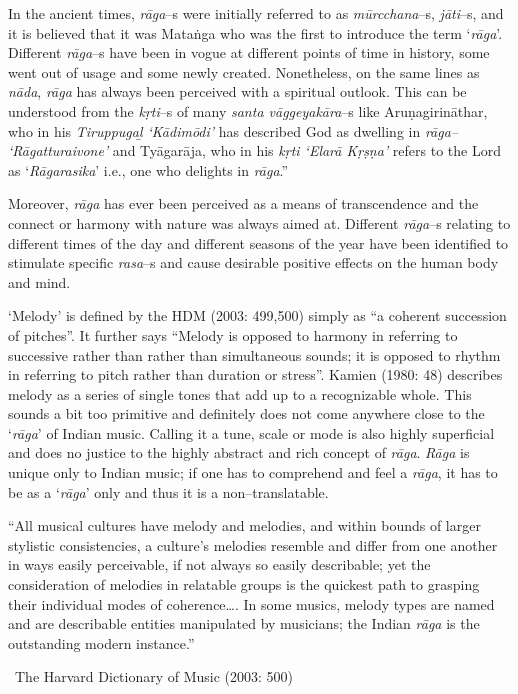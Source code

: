 In the ancient times, \textit{rāga}–s were initially referred to as \textit{mūrcchana}–s, \textit{jāti}–s, and it is believed that it was Mataṅga who was the first to introduce the term ‘\textit{rāga}’. Different \textit{rāga}–s have been in vogue at different points of time in history, some went out of usage and some newly created. Nonetheless, on the same lines as \textit{nāda}, \textit{rāga} has always been perceived with a spiritual outlook. This can be understood from the \textit{kṛti}–s of many \textit{santa vāggeyakāra}–s like Aruṇagirināthar, who in his \textit{Tiruppugaḻ ‘Kādimōdi’} has described God as dwelling in \textit{rāga– ‘Rāgatturaivone’} and Tyāgarāja, who in his \textit{kṛti ‘Elarā Kṛṣṇa’} refers to the Lord as ‘\textit{Rāgarasika}’ i.e., one who delights in \textit{rāga}.”

Moreover, \textit{rāga} has ever been perceived as a means of transcendence and the connect or harmony with nature was always aimed at. Different \textit{rāga}–s relating to different times of the day and different seasons of the year have been identified to stimulate specific \textit{rasa}–s and cause desirable positive effects on the human body and mind.

‘Melody’ is defined by the HDM (2003: 499,500) simply as “a coherent succession of pitches”. It further says “Melody is opposed to harmony in referring to successive rather than rather than simultaneous sounds; it is opposed to rhythm in referring to pitch rather than duration or stress”. Kamien (1980: 48) describes melody as a series of single tones that add up to a recognizable whole. This sounds a bit too primitive and definitely does not come anywhere close to the ‘\textit{rāga}’ of Indian music. Calling it a tune, scale or mode is also highly superficial and does no justice to the highly abstract and rich concept of \textit{rāga}. \textit{Rāga} is unique only to Indian music; if one has to comprehend and feel a \textit{rāga}, it has to be as a ‘\textit{rāga}’ only and thus it is a non–translatable.

\begin{myquote}
“All musical cultures have melody and melodies, and within bounds of larger stylistic consistencies, a culture’s melodies resemble and differ from one another in ways easily perceivable, if not always so easily describable; yet the consideration of melodies in relatable groups is the quickest path to grasping their individual modes of coherence…. In some musics, melody types are named and are describable entities manipulated by musicians; the Indian \textit{rāga} is the outstanding modern instance.” 

~\hfill The Harvard Dictionary of Music (2003: 500)
\end{myquote}

